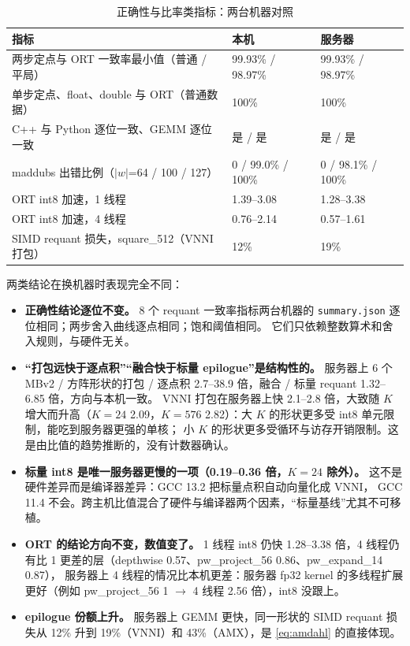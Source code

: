 \documentclass[11pt,a4paper]{ctexart}
\begin{document}
\begin{table}[H]
\centering\small
\caption{正确性与比率类指标：两台机器对照}\label{tab:crossok}
\begin{tabular}{lll}
\toprule
指标 & 本机 & 服务器 \\
\midrule
两步定点与 ORT 一致率最小值（普通 / 平局） & 99.93\% / 98.97\% & 99.93\% / 98.97\% \\
单步定点、float、double 与 ORT（普通数据） & 100\% & 100\% \\
C++ 与 Python 逐位一致、GEMM 逐位一致 & 是 / 是 & 是 / 是 \\
maddubs 出错比例（$|w|$=64 / 100 / 127） & 0 / 99.0\% / 100\% & 0 / 98.1\% / 100\% \\
ORT int8 加速，1 线程 & 1.39--3.08 & 1.28--3.38 \\
ORT int8 加速，4 线程 & 0.76--2.14 & 0.57--1.61 \\
SIMD requant 损失，square\_512（VNNI 打包） & 12\% & 19\% \\
\bottomrule
\end{tabular}
\end{table}

两类结论在换机器时表现完全不同：

\begin{itemize}
  \item \textbf{正确性结论逐位不变。} 8 个 requant 一致率指标两台机器的 \texttt{summary.json} 逐位相同；两步舍入曲线逐点相同；饱和阈值相同。
        它们只依赖整数算术和舍入规则，与硬件无关。
  \item \textbf{“打包远快于逐点积”“融合快于标量 epilogue”是结构性的。} 服务器上 6 个 MBv2 / 方阵形状的打包 / 逐点积 2.7--38.9 倍，融合 / 标量 requant 1.32--6.85 倍，方向与本机一致。
        VNNI 打包在服务器上快 2.1--2.8 倍，大致随 $K$ 增大而升高（$K=24$ 2.09，$K=576$ 2.82）：大 $K$ 的形状更多受 int8 单元限制，能吃到服务器更强的单核；
        小 $K$ 的形状更多受循环与访存开销限制。这是由比值的趋势推断的，没有计数器确认。
  \item \textbf{标量 int8 是唯一服务器更慢的一项（0.19--0.36 倍，$K=24$ 除外）。} 这不是硬件差异而是编译器差异：GCC 13.2 把标量点积自动向量化成 VNNI，
        GCC 11.4 不会。跨主机比值混合了硬件与编译器两个因素，“标量基线”尤其不可移植。
  \item \textbf{ORT 的结论方向不变，数值变了。} 1 线程 int8 仍快 1.28--3.38 倍，4 线程仍有比 1 更差的层（depthwise 0.57、pw\_project\_56 0.86、pw\_expand\_14 0.87），
        服务器上 4 线程的情况比本机更差：服务器 fp32 kernel 的多线程扩展更好（例如 pw\_project\_56 1 $\to$ 4 线程 2.56 倍），int8 没跟上。
  \item \textbf{epilogue 份额上升。} 服务器上 GEMM 更快，同一形状的 SIMD requant 损失从 12\% 升到 19\%（VNNI）和 43\%（AMX），是 \cref{eq:amdahl} 的直接体现。
\end{itemize}
\end{document}
